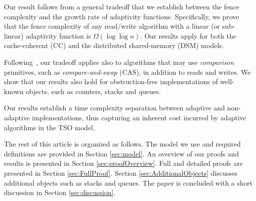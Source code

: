Our result follows from a general tradeoff that we establish between the fence complexity and the growth rate of adaptivity functions. Specifically, we prove that the fence complexity of any read/write algorithm with a linear (or sub-linear) adaptivity function is $\Omega(\log \log n)$. Our results apply for both the cache-coherent (CC) and the distributed shared-memory (DSM) models.

Following~\cite{DBLP:conf/podc/AttiyaHL13,DBLP:journals/dc/GolabHHW12},
our tradeoff applies also to algorithms that may use
\emph{comparison} primitives, such as \emph{compare-and-swap} (CAS),
in addition to reads and writes. We show that our results also hold for obstruction-free \cite{HLM03} implementations of well-known objects, such as counters, stacks and queues.

Our results establish a time complexity separation between adaptive and non-adaptive implementations, thus capturing an inherent cost incurred by adaptive algorithms in the TSO model.

The rest of this article is organized as follows. The model we use and required definitions are provided in Section \ref{sec:model}. An overview of our proofs and results is presented in Section \ref{sec:proofOverview}. Full and detailed proofs are presented in Section \ref{sec:FullProof}.  Section \ref{sec:AdditionalObjects} discusses additional objects such as stacks and queues. The paper is concluded with a short discussion in Section \ref{sec:discussion}.


